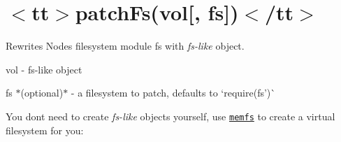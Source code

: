 \chapter{\texorpdfstring{$<$}{<}tt\texorpdfstring{$>$}{>}patch\+Fs(vol\mbox{[}, fs\mbox{]})\texorpdfstring{$<$}{<}/tt\texorpdfstring{$>$}{>}}
\hypertarget{md_node__modules_2fs-monkey_2docs_2api_2patchFs}{}\label{md_node__modules_2fs-monkey_2docs_2api_2patchFs}
\label{md_node__modules_2fs-monkey_2docs_2api_2patchFs_autotoc_md14329}%
%
 Rewrites Node\textquotesingle{}s filesystem module {\ttfamily fs} with {\itshape fs-\/like} object.


\begin{DoxyItemize}
\item {\ttfamily vol} -\/ fs-\/like object
\item {\ttfamily fs} \texorpdfstring{$\ast$}{*}(optional)\texorpdfstring{$\ast$}{*} -\/ a filesystem to patch, defaults to `require(\textquotesingle{}fs')\`{}
\end{DoxyItemize}


\begin{DoxyCode}{0}
\DoxyCodeLine{}
\DoxyCodeLine{\};}
\DoxyCodeLine{}

\end{DoxyCode}


You don\textquotesingle{}t need to create {\itshape fs-\/like} objects yourself, use \href{https://github.com/streamich/memfs}{\texttt{ {\ttfamily memfs}}} to create a virtual filesystem for you\+:


\begin{DoxyCode}{0}
\DoxyCodeLine{}

\end{DoxyCode}
 